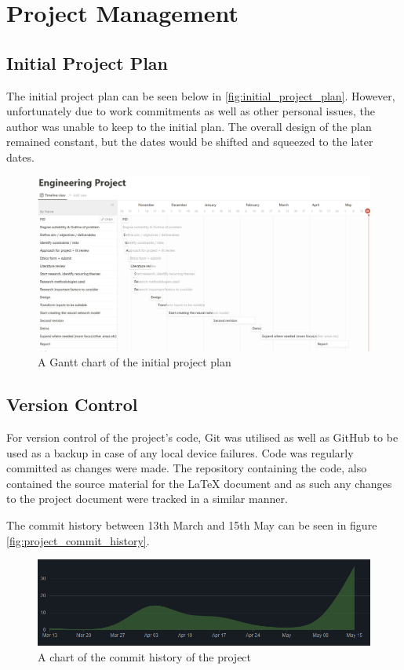 \chapter{Project Management} \label{chap:project-management}
\section{Initial Project Plan}
The initial project plan can be seen below in \autoref{fig:initial_project_plan}. However, unfortunately
due to work commitments as well as other personal issues, the author was unable to keep to the initial plan.
The overall design of the plan remained constant, but the dates would be shifted and squeezed to the later dates.

\begin{figure}
    \centering
    \includegraphics[width=0.95\columnwidth]{figures/initial_plan.png}
    \caption{A Gantt chart of the initial project plan}
    \label{fig:initial_project_plan}
\end{figure}
\FloatBarrier

\section{Version Control}
For version control of the project's code, Git was utilised as well as GitHub to be used as a backup
in case of any local device failures. Code was regularly committed as changes were made. The repository
containing the code, also contained the source material for the LaTeX document and as such any changes
to the project document were tracked in a similar manner.

The commit history between 13th March and 15th May can be seen in figure \autoref{fig:project_commit_history}.

\begin{figure}
    \centering
    \includegraphics[width=0.95\columnwidth]{figures/commit_history.png}
    \caption{A chart of the commit history of the project}
    \label{fig:project_commit_history}
\end{figure}
\FloatBarrier
